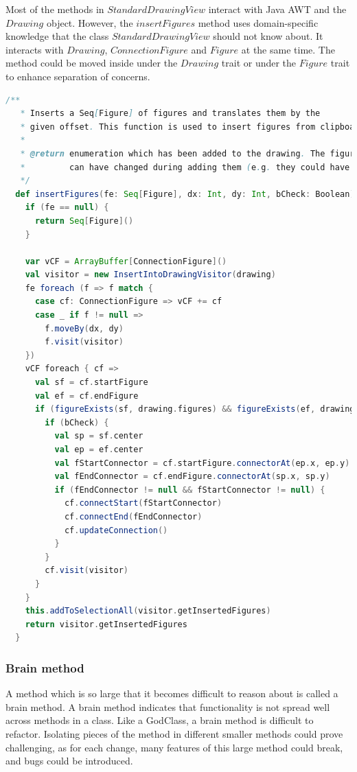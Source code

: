 \documentclass[onecolumn]{article}
\begin{document}
Most of the methods in $StandardDrawingView$ interact with Java AWT and the $Drawing$ object. However, the $insertFigures$ method uses domain-specific knowledge that the class $StandardDrawingView$ should not know about. It interacts with $Drawing$, $ConnectionFigure$ and $Figure$ at the same time. The method could be moved inside under the $Drawing$ trait or under the $Figure$ trait to enhance separation of concerns.

\begin{lstlisting}[language=scala]
/**
   * Inserts a Seq[Figure] of figures and translates them by the
   * given offset. This function is used to insert figures from clipboards (cut/copy)
   *
   * @return enumeration which has been added to the drawing. The figures in the enumeration
   *         can have changed during adding them (e.g. they could have been decorated).
   */
  def insertFigures(fe: Seq[Figure], dx: Int, dy: Int, bCheck: Boolean): Seq[Figure] = {
    if (fe == null) {
      return Seq[Figure]()
    }

    var vCF = ArrayBuffer[ConnectionFigure]()
    val visitor = new InsertIntoDrawingVisitor(drawing)
    fe foreach (f => f match {
      case cf: ConnectionFigure => vCF += cf
      case _ if f != null => 
        f.moveBy(dx, dy)
        f.visit(visitor)
    })
    vCF foreach { cf =>
      val sf = cf.startFigure
      val ef = cf.endFigure
      if (figureExists(sf, drawing.figures) && figureExists(ef, drawing.figures) && (!bCheck || cf.canConnect(sf, ef))) {
        if (bCheck) {
          val sp = sf.center
          val ep = ef.center
          val fStartConnector = cf.startFigure.connectorAt(ep.x, ep.y)
          val fEndConnector = cf.endFigure.connectorAt(sp.x, sp.y)
          if (fEndConnector != null && fStartConnector != null) {
            cf.connectStart(fStartConnector)
            cf.connectEnd(fEndConnector)
            cf.updateConnection()
          }
        }
        cf.visit(visitor)
      }
    }
    this.addToSelectionAll(visitor.getInsertedFigures)
    return visitor.getInsertedFigures
  }
\end{lstlisting}


\subsubsection{Brain method}
A method which is so large that it becomes difficult to reason about is called a brain method. A brain method indicates that functionality is not spread well across methods in a class. Like a GodClass, a brain method is difficult to refactor. Isolating pieces of the method in different smaller methods could prove challenging, as for each change, many features of this large method could break, and bugs could be introduced.
\end{document}

